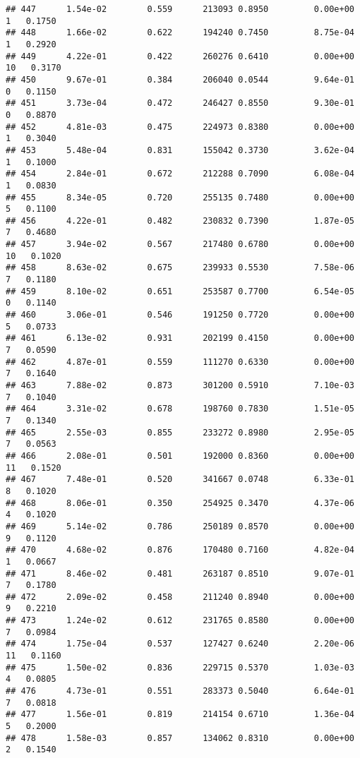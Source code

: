 \documentclass[
]{article}
\begin{document}
\begin{verbatim}
## 447      1.54e-02        0.559      213093 0.8950         0.00e+00   1   0.1750
## 448      1.66e-02        0.622      194240 0.7450         8.75e-04   1   0.2920
## 449      4.22e-01        0.422      260276 0.6410         0.00e+00  10   0.3170
## 450      9.67e-01        0.384      206040 0.0544         9.64e-01   0   0.1150
## 451      3.73e-04        0.472      246427 0.8550         9.30e-01   0   0.8870
## 452      4.81e-03        0.475      224973 0.8380         0.00e+00   1   0.3040
## 453      5.48e-04        0.831      155042 0.3730         3.62e-04   1   0.1000
## 454      2.84e-01        0.672      212288 0.7090         6.08e-04   1   0.0830
## 455      8.34e-05        0.720      255135 0.7480         0.00e+00   5   0.1100
## 456      4.22e-01        0.482      230832 0.7390         1.87e-05   7   0.4680
## 457      3.94e-02        0.567      217480 0.6780         0.00e+00  10   0.1020
## 458      8.63e-02        0.675      239933 0.5530         7.58e-06   7   0.1180
## 459      8.10e-02        0.651      253587 0.7700         6.54e-05   0   0.1140
## 460      3.06e-01        0.546      191250 0.7720         0.00e+00   5   0.0733
## 461      6.13e-02        0.931      202199 0.4150         0.00e+00   7   0.0590
## 462      4.87e-01        0.559      111270 0.6330         0.00e+00   7   0.1640
## 463      7.88e-02        0.873      301200 0.5910         7.10e-03   7   0.1040
## 464      3.31e-02        0.678      198760 0.7830         1.51e-05   7   0.1340
## 465      2.55e-03        0.855      233272 0.8980         2.95e-05   7   0.0563
## 466      2.08e-01        0.501      192000 0.8360         0.00e+00  11   0.1520
## 467      7.48e-01        0.520      341667 0.0748         6.33e-01   8   0.1020
## 468      8.06e-01        0.350      254925 0.3470         4.37e-06   4   0.1020
## 469      5.14e-02        0.786      250189 0.8570         0.00e+00   9   0.1120
## 470      4.68e-02        0.876      170480 0.7160         4.82e-04   1   0.0667
## 471      8.46e-02        0.481      263187 0.8510         9.07e-01   7   0.1780
## 472      2.09e-02        0.458      211240 0.8940         0.00e+00   9   0.2210
## 473      1.24e-02        0.612      231765 0.8580         0.00e+00   7   0.0984
## 474      1.75e-04        0.537      127427 0.6240         2.20e-06  11   0.1160
## 475      1.50e-02        0.836      229715 0.5370         1.03e-03   4   0.0805
## 476      4.73e-01        0.551      283373 0.5040         6.64e-01   7   0.0818
## 477      1.56e-01        0.819      214154 0.6710         1.36e-04   5   0.2000
## 478      1.58e-03        0.857      134062 0.8310         0.00e+00   2   0.1540

\end{verbatim}
\end{document}
